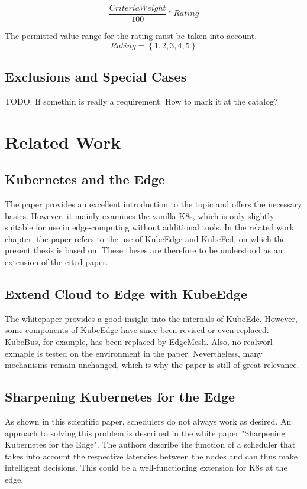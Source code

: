 \documentclass[MSC,Master,english]{twbook}%
\begin{document}
\begin{equation*}
    \frac{CriteriaWeight}{100}*Rating
\end{equation*}

The permitted value range for the rating must be taken into account.
\begin{equation*}
    Rating = \left\{1,2,3,4,5  \right\}
\end{equation*}

\section{Exclusions and Special Cases}
\label{sec:exclusions}
TODO: If somethin is really a requirement. How to mark it at the catalog?



\chapter{Related Work}
\label{chap:related}
\section{Kubernetes and the Edge}
The paper\cite{hal-kubeedge} provides an excellent introduction to the topic and offers the necessary basics. However, it mainly examines the vanilla \ac{K8s}, which is only slightly suitable for use in edge-computing without additional tools. In the related work chapter, the paper refers to the use of KubeEdge and KubeFed, on which the present thesis is based on. These theses are therefore to be understood as an extension of the cited paper.

\section{Extend Cloud to Edge with KubeEdge}
The whitepaper\cite{kubedge} provides a good insight into the internals of KubeEde. However, some components of KubeEdge have since been revised or even replaced. KubeBus, for example, has been replaced by EdgeMesh. Also, no realworl exmaple is tested on the environment in the paper. Nevertheless, many mechanisms remain unchanged, which is why the paper is still of great relevance.

\section{Sharpening Kubernetes for the Edge}
\label{sec:sharp-k8s-edge}
As shown in this scientific paper, schedulers do not always work as desired. An approach to solving this problem is described in the white paper "Sharpening Kubernetes for the Edge"\cite{k8s-sharping-edge}. The authors describe the function of a scheduler that takes into account the respective latencies between the nodes and can thus make intelligent decisions. This could be a well-functioning extension for K8s at the edge.
\end{document}
